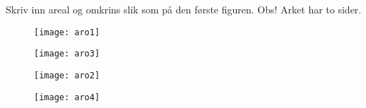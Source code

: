 

\geometry{verbose,a4paper, inner=2cm, outer=1 cm, bmargin=2cm, tmargin=1cm}


\huge

Skriv inn areal og omkrins slik som på den første figuren. Obs! Arket har to sider. \vspace{20pt}
	
\begin{figure}
	\centering
	\texttt{[image: aro1]}
\end{figure}
\vspace{50pt}
\begin{figure}
	\centering
	\texttt{[image: aro3]}
\end{figure}
\newpage
\vspace{20pt}

\begin{figure}
	\centering
	\texttt{[image: aro2]}
\end{figure}
\vspace{100pt}
\begin{figure}
	\centering
	\texttt{[image: aro4]}
\end{figure}
